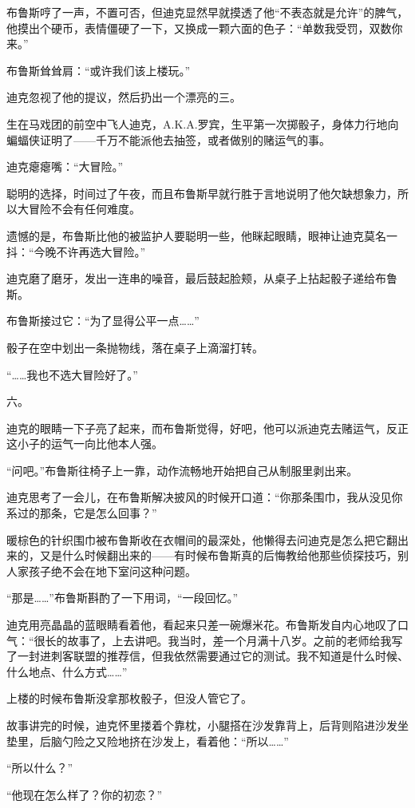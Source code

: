 \documentclass[../main]{subfiles}
\begin{document}
布鲁斯哼了一声，不置可否，但迪克显然早就摸透了他“不表态就是允许”的脾气，他摸出个硬币，表情僵硬了一下，又换成一颗六面的色子：“单数我受罚，双数你来。”

布鲁斯耸耸肩：“或许我们该上楼玩。”

迪克忽视了他的提议，然后扔出一个漂亮的三。

生在马戏团的前空中飞人迪克，A.K.A.罗宾，生平第一次掷骰子，身体力行地向蝙蝠侠证明了——千万不能派他去抽签，或者做别的赌运气的事。

迪克瘪瘪嘴：“大冒险。”

聪明的选择，时间过了午夜，而且布鲁斯早就行胜于言地说明了他欠缺想象力，所以大冒险不会有任何难度。

遗憾的是，布鲁斯比他的被监护人要聪明一些，他眯起眼睛，眼神让迪克莫名一抖：“今晚不许再选大冒险。”

迪克磨了磨牙，发出一连串的噪音，最后鼓起脸颊，从桌子上拈起骰子递给布鲁斯。

布鲁斯接过它：“为了显得公平一点\ldots\ldots”

骰子在空中划出一条抛物线，落在桌子上滴溜打转。

“……我也不选大冒险好了。”

六。

迪克的眼睛一下子亮了起来，而布鲁斯觉得，好吧，他可以派迪克去赌运气，反正这小子的运气一向比他本人强。

“问吧。”布鲁斯往椅子上一靠，动作流畅地开始把自己从制服里剥出来。

迪克思考了一会儿，在布鲁斯解决披风的时候开口道：“你那条围巾，我从没见你系过的那条，它是怎么回事？”

暖棕色的针织围巾被布鲁斯收在衣帽间的最深处，他懒得去问迪克是怎么把它翻出来的，又是什么时候翻出来的——有时候布鲁斯真的后悔教给他那些侦探技巧，别人家孩子绝不会在地下室问这种问题。

“那是\ldots\ldots”布鲁斯斟酌了一下用词，“一段回忆。”

迪克用亮晶晶的蓝眼睛看着他，看起来只差一碗爆米花。布鲁斯发自内心地叹了口气：“很长的故事了，上去讲吧。我当时，差一个月满十八岁。之前的老师给我写了一封进刺客联盟的推荐信，但我依然需要通过它的测试。我不知道是什么时候、什么地点、什么方式\ldots\ldots”

上楼的时候布鲁斯没拿那枚骰子，但没人管它了。

故事讲完的时候，迪克怀里搂着个靠枕，小腿搭在沙发靠背上，后背则陷进沙发坐垫里，后脑勺险之又险地挤在沙发上，看着他：“所以\ldots\ldots”

“所以什么？”

“他现在怎么样了？你的初恋？”
\end{document}
